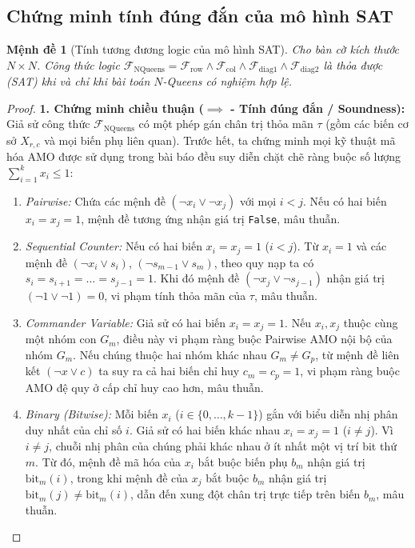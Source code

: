 \documentclass[11pt,a4paper]{article}
\newtheorem{proposition}{Mệnh đề}
\begin{document}
\subsection{Chứng minh tính đúng đắn của mô hình SAT}
\begin{proposition}[Tính tương đương logic của mô hình SAT]
Cho bàn cờ kích thước $N \times N$. Công thức logic $\mathcal{F}_{\text{NQueens}} = \mathcal{F}_{\text{row}} \land \mathcal{F}_{\text{col}} \land \mathcal{F}_{\text{diag1}} \land \mathcal{F}_{\text{diag2}}$ là thỏa được (SAT) khi và chỉ khi bài toán $N$-Queens có nghiệm hợp lệ.
\end{proposition}
\begin{proof}
\noindent\textbf{1. Chứng minh chiều thuận ($\implies$ - Tính đúng đắn / Soundness):}\\
Giả sử công thức $\mathcal{F}_{\text{NQueens}}$ có một phép gán chân trị thỏa mãn $\tau$ (gồm các biến cơ sở $X_{r,c}$ và mọi biến phụ liên quan).
Trước hết, ta chứng minh mọi kỹ thuật mã hóa AMO được sử dụng trong bài báo đều suy diễn chặt chẽ ràng buộc số lượng $\sum_{i=1}^k x_i \le 1$:
\begin{enumerate}
    \item \textit{Pairwise:} Chứa các mệnh đề $(\neg x_i \lor \neg x_j)$ với mọi $i < j$. Nếu có hai biến $x_i = x_j = 1$, mệnh đề tương ứng nhận giá trị \texttt{False}, mâu thuẫn.
    \item \textit{Sequential Counter:} Nếu có hai biến $x_i = x_j = 1$ ($i < j$). Từ $x_i = 1$ và các mệnh đề $(\neg x_i \lor s_i)$, $(\neg s_{m-1} \lor s_m)$, theo quy nạp ta có $s_i = s_{i+1} = \dots = s_{j-1} = 1$. Khi đó mệnh đề $(\neg x_j \lor \neg s_{j-1})$ nhận giá trị $(\neg 1 \lor \neg 1) = 0$, vi phạm tính thỏa mãn của $\tau$, mâu thuẫn.
    \item \textit{Commander Variable:} Giả sử có hai biến $x_i = x_j = 1$. Nếu $x_i, x_j$ thuộc cùng một nhóm con $G_m$, điều này vi phạm ràng buộc Pairwise AMO nội bộ của nhóm $G_m$. Nếu chúng thuộc hai nhóm khác nhau $G_m \neq G_p$, từ mệnh đề liên kết $(\neg x \lor c)$ ta suy ra cả hai biến chỉ huy $c_m = c_p = 1$, vi phạm ràng buộc AMO đệ quy ở cấp chỉ huy cao hơn, mâu thuẫn.
    \item \textit{Binary (Bitwise):} Mỗi biến $x_i$ ($i \in \{0, \dots, k-1\}$) gắn với biểu diễn nhị phân duy nhất của chỉ số $i$. Giả sử có hai biến khác nhau $x_i = x_j = 1$ ($i \neq j$). Vì $i \neq j$, chuỗi nhị phân của chúng phải khác nhau ở ít nhất một vị trí bit thứ $m$. Từ đó, mệnh đề mã hóa của $x_i$ bắt buộc biến phụ $b_m$ nhận giá trị $\text{bit}_m(i)$, trong khi mệnh đề của $x_j$ bắt buộc $b_m$ nhận giá trị $\text{bit}_m(j) \neq \text{bit}_m(i)$, dẫn đến xung đột chân trị trực tiếp trên biến $b_m$, mâu thuẫn.

\end{enumerate}
\end{proof}
\end{document}
